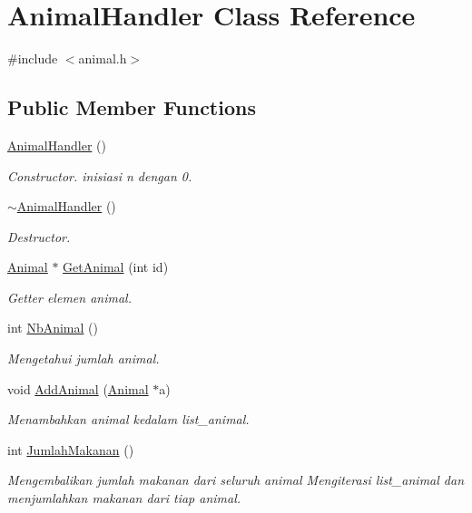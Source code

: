 \hypertarget{classAnimalHandler}{}\section{Animal\+Handler Class Reference}
\label{classAnimalHandler}


{\ttfamily \#include $<$animal.\+h$>$}

\subsection*{Public Member Functions}
\begin{DoxyCompactItemize}
\item 
\hyperlink{classAnimalHandler_a53551d20027ea45c16e05e50cc105d3c}{Animal\+Handler} ()\hypertarget{classAnimalHandler_a53551d20027ea45c16e05e50cc105d3c}{}\label{classAnimalHandler_a53551d20027ea45c16e05e50cc105d3c}

\begin{DoxyCompactList}\small\item\em Constructor. inisiasi n dengan 0. \end{DoxyCompactList}\item 
\hyperlink{classAnimalHandler_a37b9bbd41298a75ade76cf0bc787ee92}{$\sim$\+Animal\+Handler} ()\hypertarget{classAnimalHandler_a37b9bbd41298a75ade76cf0bc787ee92}{}\label{classAnimalHandler_a37b9bbd41298a75ade76cf0bc787ee92}

\begin{DoxyCompactList}\small\item\em Destructor. \end{DoxyCompactList}\item 
\hyperlink{classAnimal}{Animal} $\ast$ \hyperlink{classAnimalHandler_a5484cd394f30786259aa93ba3c88bfce}{Get\+Animal} (int id)
\begin{DoxyCompactList}\small\item\em Getter elemen animal. \end{DoxyCompactList}\item 
int \hyperlink{classAnimalHandler_a5254f930160c47370c5f226c996cec2d}{Nb\+Animal} ()
\begin{DoxyCompactList}\small\item\em Mengetahui jumlah animal. \end{DoxyCompactList}\item 
void \hyperlink{classAnimalHandler_a5d85a87f7aac6373839018a2ff67b648}{Add\+Animal} (\hyperlink{classAnimal}{Animal} $\ast$a)
\begin{DoxyCompactList}\small\item\em Menambahkan animal kedalam list\+\_\+animal. \end{DoxyCompactList}\item 
int \hyperlink{classAnimalHandler_a3df3838f7ce62e0befef35dd57b18164}{Jumlah\+Makanan} ()
\begin{DoxyCompactList}\small\item\em Mengembalikan jumlah makanan dari seluruh animal Mengiterasi list\+\_\+animal dan menjumlahkan makanan dari tiap animal. \end{DoxyCompactList}\end{DoxyCompactItemize}


